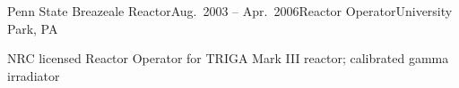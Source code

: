 


\begin{rSubsection}{Penn State Breazeale Reactor}{Aug.\ 2003 -- Apr.\ 2006}{Reactor Operator}{University Park, PA}
\item NRC licensed Reactor Operator for TRIGA Mark III reactor; calibrated gamma irradiator
\end{rSubsection}
